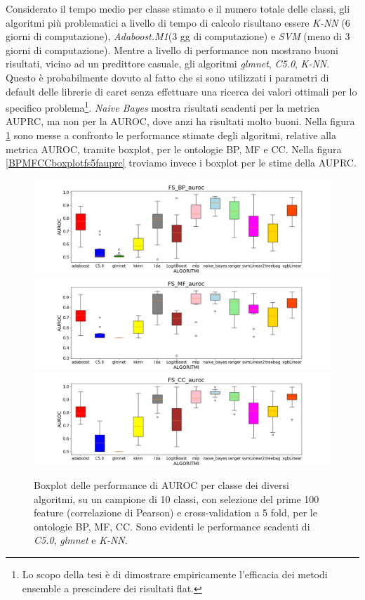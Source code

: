 \documentclass[12pt]{report}
\begin{document}
Considerato il tempo medio per classe stimato e il numero totale delle classi, gli algoritmi più problematici a livello di tempo di calcolo risultano essere \emph{K-NN} (6 giorni di computazione), \emph{Adaboost.M1}(3 gg di computazione) e \emph{SVM} (meno di 3 giorni di computazione). Mentre a livello di performance non mostrano buoni risultati, vicino ad un predittore casuale, gli algoritmi \emph{glmnet}, \emph{C5.0}, \emph{K-NN}. Questo è probabilmente dovuto al fatto che si sono utilizzati i parametri di default delle librerie di caret senza effettuare una ricerca dei valori ottimali per lo specifico problema\footnote{\footnotesize{Lo scopo della tesi è di dimostrare empiricamente l'efficacia dei metodi ensemble a prescindere dei risultati flat.}}. \emph{Naive Bayes} mostra risultati scadenti per la metrica AUPRC, ma non per la AUROC, dove anzi ha risultati molto buoni. Nella figura \ref{BPMFCCboxplotfs5f} sono messe a confronto le performance stimate degli algoritmi, relative alla metrica AUROC, tramite boxplot, per le ontologie BP, MF e CC. Nella figura \ref{BPMFCCboxplotfs5fauprc} troviamo invece i boxplot per le stime della AUPRC.
\begin{figure}[hp!]
\centering
\includegraphics[scale=0.37]{./images/FS_BP_auroc.png}
\includegraphics[scale=0.37]{./images/FS_MF_auroc.png}
\includegraphics[scale=0.37]{./images/FS_CC_auroc.png}
\caption{\footnotesize{Boxplot delle performance di AUROC per classe dei diversi algoritmi, su un campione di 10 classi, con selezione del prime 100 feature (correlazione di Pearson) e cross-validation a 5 fold, per le ontologie BP, MF, CC. Sono evidenti le performance scadenti di \emph{C5.0}, \emph{glmnet} e \emph{K-NN}.}}
\label{BPMFCCboxplotfs5f}
\end{figure}
\end{document}
